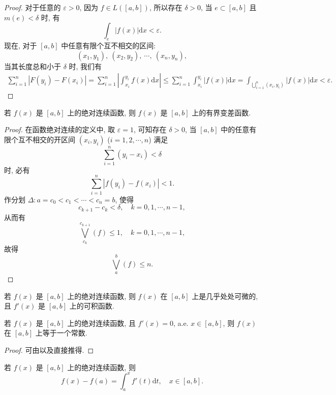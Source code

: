 \documentclass[../../main.tex]{subfiles}%
\begin{document}
\begin{proof}

对于任意的 $\varepsilon>0$, 因为 $f\in L([a,b])$, 所以存在 $\delta>0$, 当 $e\subset[a,b]$ 且 $m(e)<\delta$ 时, 有
\[
\int_e |f(x)|\mathrm{d}x < \varepsilon.
\]
现在, 对于 $[a,b]$ 中任意有限个互不相交的区间:
\[
(x_1,y_1),\ (x_2,y_2),\ \cdots,\ (x_n,y_n),
\]
当其长度总和小于 $\delta$ 时, 我们有
\begin{align*}
\sum_{i=1}^n |F(y_i)-F(x_i)| = \sum_{i=1}^n \left|\int_{x_i}^{y_i} f(x)\mathrm{d}x\right| \leqslant \sum_{i=1}^n \int_{x_i}^{y_i} |f(x)|\mathrm{d}x 
= \int_{\bigcup_{i=1}^n (x_i,y_i)} |f(x)|\mathrm{d}x < \varepsilon.
\end{align*}

\end{proof}

\begin{theorem}
若 $f(x)$ 是 $[a,b]$ 上的绝对连续函数, 则 $f(x)$ 是 $[a,b]$ 上的有界变差函数.
\end{theorem}
\begin{proof}

在函数绝对连续的定义中, 取 $\varepsilon=1$, 可知存在 $\delta>0$, 当 $[a,b]$ 中的任意有限个互不相交的开区间 $(x_i,y_i)$ ($i=1,2,\cdots,n$) 满足
\[
\sum_{i=1}^n (y_i-x_i) < \delta
\]
时, 必有
\[
\sum_{i=1}^n |f(y_i)-f(x_i)| < 1.
\]
作分划 $\Delta: a=c_0 < c_1 < \cdots < c_n = b$, 使得
\[
c_{k+1}-c_k < \delta,\quad k=0,1,\cdots,n-1,
\]
从而有
\[
\bigvee_{c_k}^{c_{k+1}}(f) \leqslant 1,\quad k=0,1,\cdots,n-1,
\]
故得
\[
\bigvee_a^b(f) \leqslant n.
\]

\end{proof}

\begin{corollary}\label{corollary:绝对连续函数几乎处处可微且导数可积}
若 $f(x)$ 是 $[a,b]$ 上的绝对连续函数, 则 $f(x)$ 在 $[a,b]$ 上是几乎处处可微的, 且 $f'(x)$ 是 $[a,b]$ 上的可积函数.
\end{corollary}

\begin{theorem}
若 $f(x)$ 是 $[a,b]$ 上的绝对连续函数, 且 $f'(x)=0$, a.e. $x\in[a,b]$, 则 $f(x)$ 在 $[a,b]$ 上等于一个常数.
\end{theorem}
\begin{proof}

可由以及直接推得.

\end{proof}


\begin{theorem}[微积分基本定理]\label{theorem:实变函数--微积分基本定理}
若 $f(x)$ 是 $[a,b]$ 上的绝对连续函数, 则
\[
f(x)-f(a) = \int_a^x f'(t)\mathrm{d}t,\quad x\in[a,b]. \tag{5.11}
\]
\end{theorem}
\end{document}
